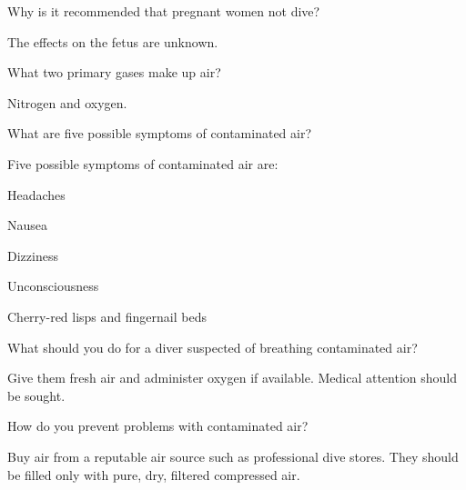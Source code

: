 	\begin{qanda}
		\begin{question}
Why is it recommended that pregnant women not dive?
		\end{question}

		\begin{answer}
The effects on the fetus are unknown.
		\end{answer}
	\end{qanda}

	\begin{qanda}
		\begin{question}
What two primary gases make up air?
		\end{question}

		\begin{answer}
Nitrogen and oxygen.
		\end{answer}
	\end{qanda}

	\begin{qanda}
		\begin{question}
What are five possible symptoms of contaminated air?
		\end{question}

		\begin{answer}
Five possible symptoms of contaminated air are:
			\begin{nospacenumberedlist}
				\item Headaches
				\item Nausea
				\item Dizziness
				\item Unconsciousness
				\item Cherry-red lisps and fingernail beds
			\end{nospacenumberedlist}
		\end{answer}
	\end{qanda}

	\begin{qanda}
		\begin{question}
What should you do for a diver suspected of breathing contaminated air?
		\end{question}

		\begin{answer}
Give them fresh air and administer oxygen if available.  Medical attention should be sought.%
		\end{answer}
	\end{qanda}

	\begin{qanda}
		\begin{question}
How do you prevent problems with contaminated air?
		\end{question}

		\begin{answer}
Buy air from a reputable air source such as professional dive stores. They should be filled only with pure, dry, filtered compressed air.
		\end{answer}
	\end{qanda}

